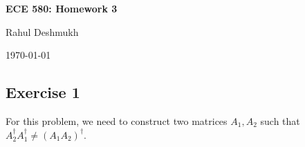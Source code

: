 \documentclass[11pt]{article}
\newcommand{\mat}[1]{\begin{bmatrix}#1\end{bmatrix}}
\begin{document}
\begin{center}
\Large{\textbf{ECE 580: Homework 3}}

Rahul Deshmukh

\today
\end{center}



\subsection*{Exercise 1} 
For this problem, we need to construct two matrices $A_1,A_2$ such that $A_2^{\dagger}A_1^{\dagger} \neq (A_1A_2)^{\dagger} $.

% 
\end{document}
